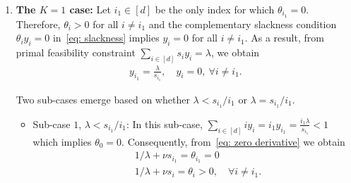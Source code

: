 \documentclass[a4paper]{article}
\theoremstyle{plain}
\theoremstyle{definition}
\theoremstyle{case}
\theoremstyle{remark}
\newcommand{\brac}[1]{\left(#1\right)}
\begin{document}
\begin{enumerate}
\begin{itemize}
        \end{itemize}
        then any 
        $y\in \mathbb{R}^d_+$ which satisfies~\eqref{eq: first K sum subcase2},~\eqref{eq: first K-1 sum subcase2},  and $y_i=0$ for all $i\notin \{i_1,i_2,\ldots,i_K\}$ is a primal optimal solution of~\eqref{eq:opt}. In particular,
        \begin{align*}
            y_{i_k}&=\frac{\frac{1}{i_k}\brac{\lambda-\frac{s_{i_{k+1}}}{i_{k+1}}}}{\frac{s_{i_k}}{i_k}-\frac{s_{i_{k+1}}}{i_{k+1}}}, \\ 
            y_{i_{k+1}}&=\frac{\frac{1}{i_{k+1}}\brac{\frac{s_{{i_k}}}{i_k}-\lambda}}{\frac{s_{i_k}}{i_k}-\frac{s_{i_{k+1}}}{i_{k+1}}},\\
            y_i&=0, \forall i \notin \{i_{k},i_{k+1}\}.
        \end{align*}
        constitutes one such optimal solution. Furthermore, when $K=2$, the above is the unique optimal solution. This establishes the last part of Theorem~\ref{thm:optimization}.
     

        
    
    \item \textbf{The $K=1$ case:} Let $i_1 \in [d]$ be the only index for which $\theta_{i_1} =0$. Therefore, $\theta_i >0$ for all $i \neq i_1$ and the complementary slackness condition $\theta_i y_i=0$ in~\eqref{eq: slackness} implies $y_{i}=0$ for all $i \not= i_1$. As a result, from primal feasibility constraint $\sum_{i \in [d]} s_{i} y_i = \lambda$, we obtain
    \begin{align*}
        y_{i_1} = \frac{\lambda}{s_{i_1}},\quad y_{i} = 0,~ \forall i \not = i_1.
    \end{align*}

    Two sub-cases emerge based on whether $\lambda < s_{i_1} / i_1$ or $\lambda = s_{i_1} / i_1$.
    \begin{itemize}
        \item Sub-case $1$, $\lambda< s_{i_1} / i_1$: In this sub-case,  $\sum_{i \in [d]} i y_i  = i_1 y_{i_1}=\frac{i_1\lambda}{s_{i_1}}<1$ which implies $\theta_0 = 0$. Consequently, from~\eqref{eq: zero derivative} we obtain
    \begin{align*}
        &1/\lambda+ \nu s_{i_1} = \theta_{i_1}=0
        \\ &1/\lambda+ \nu s_i = \theta_i >0, \quad\forall i \not= i_1.
    \end{align*}


\end{itemize}
\end{enumerate}
\end{document}
